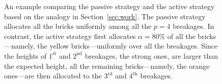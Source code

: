 \documentclass[11pt,onecolumn]{article}
\begin{document}
\begin{figure}[t]
	\caption{An example comparing the passive strategy and the active strategy  based on the analogy in Section~\ref{sec:work}.   The passive strategy allocates all the bricks uniformly among all the $p=4$ breakages. In contrast, the active strategy first allocates $\alpha=80\%$ of all the bricks---namely, the yellow bricks---uniformly over all the breakages. Since the heights of $1^{\mathrm{st}}$ and $2^{\mathrm{nd}}$ breakages, the strong ones, are larger than the expected height, all the remaining bricks---namely, the orange ones---are then allocated to the $3^{\mathrm{rd}}$ and $4^{\mathrm{th}}$ breakages.} 
	\label{fig:demo_fig}
\end{figure}
\end{document}
